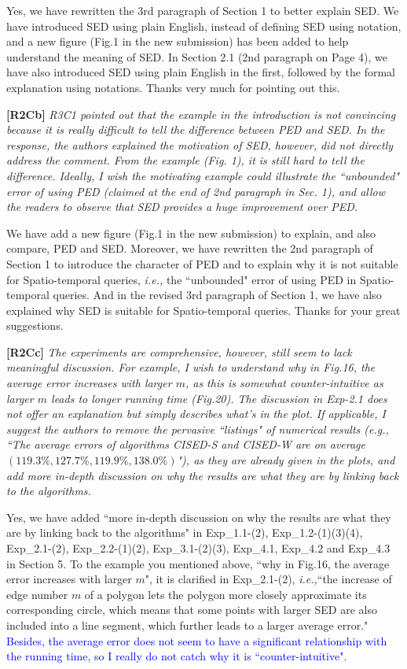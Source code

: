 \documentclass{letter}
\newcommand{\ie}{\emph{i.e.,}\xspace}
\begin{document}
Yes, we have rewritten the 3rd paragraph of Section 1 to better explain SED. We have introduced SED using plain English, instead of defining SED using notation, and a new figure (Fig.1 in the new submission) has been added to help understand the meaning of SED.
{In Section 2.1 (2nd paragraph on Page 4), we have also introduced SED using plain English in the first, followed by the formal explanation using notations.}
Thanks very much for pointing out this.


\textbf{[R2Cb]} \emph{{R3C1} pointed out that the example in the introduction is not convincing because it is really difficult to tell the difference between PED and SED. In the response, the authors explained the motivation of SED, however, did not directly address the comment. From the example (Fig. 1), it is still hard to tell the difference. Ideally, I wish the motivating example could illustrate the ``unbounded" error of using PED (claimed at the end of 2nd paragraph in Sec. 1), and allow the readers to observe that SED provides a huge improvement over PED.}

We have add a new figure (Fig.1 in the new submission) to explain, and also compare, PED and SED. Moreover, we have rewritten the 2nd paragraph of Section 1 to introduce the character of PED and to explain why it is not suitable for Spatio-temporal queries, \ie the ``unbounded" error of using PED in Spatio-temporal queries. And in the revised 3rd paragraph of Section 1, we have also explained why SED is suitable for Spatio-temporal queries.
Thanks for your great suggestions.

\textbf{[R2Cc]} \emph{The experiments are comprehensive, however, still seem to lack meaningful discussion. For example, I wish to understand why in Fig.16, the average error increases with larger $m$, as this is somewhat counter-intuitive as larger $m$ leads to longer running time (Fig.20). The discussion in Exp-2.1 does not offer an explanation but simply describes what's in the plot. If applicable, I suggest the authors to remove the pervasive ``listings" of numerical results (e.g., ``The average errors of algorithms CISED-S and CISED-W are on average $(119.3\%, 127.7\%, 119.9\%, 138.0\%)$"), as they are already given in the plots, and add more in-depth discussion on why the results are what they are by linking back to the algorithms. }

Yes, we have added ``more in-depth discussion on why the results are what they are by linking back to the algorithms" in Exp\_1.1-(2), Exp\_1.2-(1)(3)(4), Exp\_2.1-(2), Exp\_2.2-(1)(2), Exp\_3.1-(2)(3), Exp\_4.1, Exp\_4.2 and Exp\_4.3 in Section 5.
To the example you mentioned above,  ``why in Fig.16, the average error increases with larger $m$", it is clarified in Exp\_2.1-(2), \ie ``the increase of edge number $m$ of a polygon lets the polygon more closely approximate its corresponding circle, which means that some points with larger SED are also included into a line segment, which further leads to a larger average error." \textcolor{blue}{Besides, the average error does not seem to have a significant relationship with the running time, so I really do not catch why it is ``counter-intuitive".}
\end{document}

